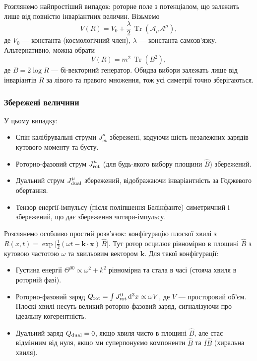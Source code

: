 \documentclass[11pt,a4paper]{article}
\numberwithin{equation}{section}
\theoremstyle{plain}
\theoremstyle{definition}
\theoremstyle{remark}
\DeclareMathOperator{\Tr}{Tr}
\newcommand{\dd}{\mathrm{d}}
\begin{document}
Розглянемо найпростіший випадок: роторне поле з потенціалом, що залежить лише від повністю інваріантних величин. Візьмемо
\begin{equation}
V(R) = V_0 + \frac{\lambda}{2}\,\Tr(\mathcal{A}_\mu\mathcal{A}^\mu),
\end{equation}
де $V_0$ — константа (космологічний член), $\lambda$ — константа самозв'язку. Альтернативно, можна обрати
\begin{equation}
V(R) = m^2\,\Tr(B^2),
\end{equation}
де $B = 2\log R$ — бі-векторний генератор. Обидва вибори залежать лише від інваріантів $R$ за лівого та правого множення, тож усі симетрії точно зберігаються.

\subsubsection{Збережені величини}

У цьому випадку:

\begin{itemize}
  \item Спін-калібрувальні струми $J^\mu_{ab}$ збережені, кодуючи шість незалежних зарядів кутового моменту та бусту.
  \item Роторно-фазовий струм $J^\mu_{\rm rot}$ (для будь-якого вибору площини $\hat{B}$) збережений.
  \item Дуальний струм $J^\mu_{\rm dual}$ збережений, відображаючи інваріантність за Годжевого обертання.
  \item Тензор енергії-імпульсу (після поліпшення Белінфанте) симетричний і збережений, що дає збереження чотири-імпульсу.
\end{itemize}

Розглянемо особливо простий розв'язок: конфігурацію плоскої хвилі з $R(x,t) = \exp\big[\frac{1}{2}(\omega t - \mathbf{k}\cdot\mathbf{x})\,\hat{B}\big]$. Тут ротор осцилює рівномірно в площині $\hat{B}$ з кутовою частотою $\omega$ та хвильовим вектором $\mathbf{k}$. Для такої конфігурації:

\begin{itemize}
  \item Густина енергії $\Theta^{00} \propto \omega^2 + k^2$ рівномірна та стала в часі (стояча хвиля в роторній фазі).
  \item Роторно-фазовий заряд $Q_{\rm rot} = \int J^0_{\rm rot}\,\dd^3x \propto \omega V$, де $V$ — просторовий об'єм. Плоскі хвилі несуть великий роторно-фазовий заряд, сигналізуючи про ідеальну когерентність.
  \item Дуальний заряд $Q_{\rm dual} = 0$, якщо хвиля чисто в площині $\hat{B}$, але стає відмінним від нуля, якщо ми суперпонуємо компоненти $\hat{B}$ та $I\hat{B}$ (хиральна хвиля).
\end{itemize}
\end{document}
